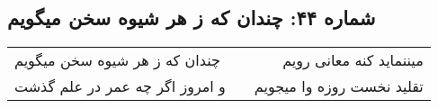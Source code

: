 \begin{center}
\section*{شماره ۴۴: چندان که ز هر شیوه سخن میگویم}
\label{sec:044}
\begin{longtable}{l p{0.5cm} r}
چندان که ز هر شیوه سخن میگویم
&&
میننماید کنه معانی رویم
\\
و امروز اگر چه عمر در علم گذشت
&&
تقلید نخست روزه وا میجویم
\\
\end{longtable}
\end{center}
